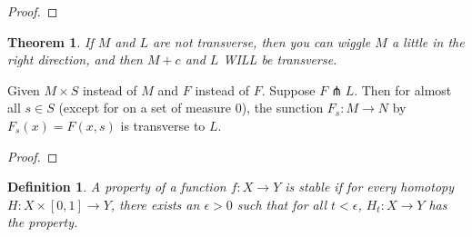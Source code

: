 \documentclass[11pt,leqno,oneside]{amsart}
\newcommand{\x}{\times}
\theoremstyle{mystyle} \newtheorem{thrm}[thm]{Theorem}
\theoremstyle{mystyle} \newtheorem{defi}[thm]{Definition}
\begin{document}
\begin{proof}







\end{proof}
\begin{thrm}
	If $M$ and $L$ are not transverse, then you can wiggle $M$ a little in the right direction, and then $M+c$ and $L$ WILL be transverse.
\end{thrm}
\begin{lem}
	Given $M \x S$ instead of $M$ and $F$ instead of $F$.  Suppose $F \pitchfork L$.  Then for almost all $s \in S$ (except for on a set of measure 0), the sunction $F_s: M \to N$ by $F_s(x) = F(x,s)$ is transverse to $L$.
\end{lem}
\begin{lem}
\end{lem}
\begin{proof}
\end{proof}
\begin{defi}
	A property of a function $f : X \to Y$ is \emph{stable} if for every homotopy $H : X \x [0,1] \to Y$, there exists an $\epsilon > 0$ such that for all $t < \epsilon$, $H_t : X \to Y$ has the property.
\end{defi}
\end{document}
